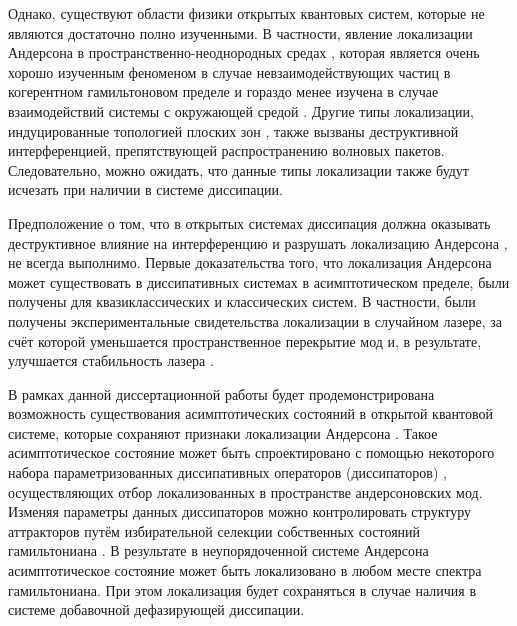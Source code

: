 Однако, существуют области физики открытых квантовых систем, которые не являются достаточно полно изученными. В частности, явление локализации Андерсона в пространственно-неоднородных средах \autocite{Anderson1958, Kramer1993, Evers2008, Esposito2012}, которая является очень хорошо изученным феноменом в случае невзаимодействующих частиц в когерентном гамильтоновом пределе \autocite{Segev2013, Billy2008, Roati2008, Yedjour2010, Kondov2011, Jendrzejewski2012} и гораздо менее изучена в случае взаимодействий системы с окружающей средой \autocite{Breuer2007}. Другие типы локализации, индуцированные топологией плоских зон \autocite{Derzhko2006, Bergman2008, Flach2014}, также вызваны деструктивной интерференцией, препятствующей распространению волновых пакетов. Следовательно, можно ожидать, что данные типы локализации также будут исчезать при наличии в системе диссипации.

Предположение о том, что в открытых системах диссипация должна оказывать деструктивное влияние на интерференцию и разрушать локализацию Андерсона \autocite{Genway2014}, не всегда выполнимо.
Первые доказательства того, что локализация Андерсона может существовать в диссипативных системах в асимптотическом пределе, были получены для квазиклассических и классических систем. В частности, были получены экспериментальные свидетельства локализации в случайном лазере, за счёт которой уменьшается пространственное перекрытие мод и, в результате, улучшается стабильность лазера \autocite{Stano2012, Liu2014}.

В рамках данной диссертационной работы будет продемонстрирована возможность существования асимптотических состояний в открытой квантовой системе, которые сохраняют признаки локализации Андерсона \cite{Yusipov2017}. Такое асимптотическое состояние может быть спроектировано с помощью некоторого набора параметризованных диссипативных операторов (диссипаторов) \autocite{Diehl2008}, осуществляющих отбор локализованных в пространстве андерсоновских мод.
Изменяя параметры данных диссипаторов можно контролировать структуру аттракторов путём избирательной селекции собственных состояний гамильтониана \cite{Vershinina2017}. В результате в неупорядоченной системе Андерсона асимптотическое состояние может быть локализовано в любом месте спектра гамильтониана. При этом локализация будет сохраняться в случае наличия в системе добавочной дефазирующей диссипации.

